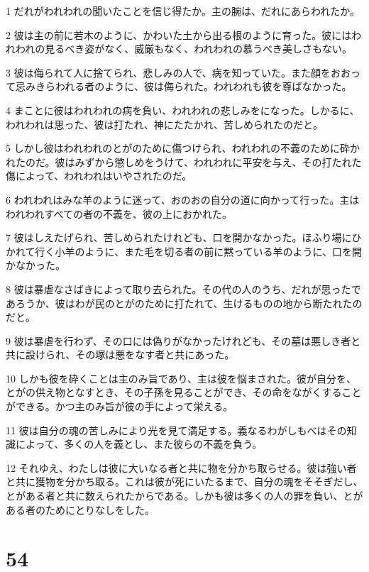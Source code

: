 \par 1 だれがわれわれの聞いたことを信じ得たか。主の腕は、だれにあらわれたか。
\par 2 彼は主の前に若木のように、かわいた土から出る根のように育った。彼にはわれわれの見るべき姿がなく、威厳もなく、われわれの慕うべき美しさもない。
\par 3 彼は侮られて人に捨てられ、悲しみの人で、病を知っていた。また顔をおおって忌みきらわれる者のように、彼は侮られた。われわれも彼を尊ばなかった。
\par 4 まことに彼はわれわれの病を負い、われわれの悲しみをになった。しかるに、われわれは思った、彼は打たれ、神にたたかれ、苦しめられたのだと。
\par 5 しかし彼はわれわれのとがのために傷つけられ、われわれの不義のために砕かれたのだ。彼はみずから懲しめをうけて、われわれに平安を与え、その打たれた傷によって、われわれはいやされたのだ。
\par 6 われわれはみな羊のように迷って、おのおの自分の道に向かって行った。主はわれわれすべての者の不義を、彼の上におかれた。
\par 7 彼はしえたげられ、苦しめられたけれども、口を開かなかった。ほふり場にひかれて行く小羊のように、また毛を切る者の前に黙っている羊のように、口を開かなかった。
\par 8 彼は暴虐なさばきによって取り去られた。その代の人のうち、だれが思ったであろうか、彼はわが民のとがのために打たれて、生けるものの地から断たれたのだと。
\par 9 彼は暴虐を行わず、その口には偽りがなかったけれども、その墓は悪しき者と共に設けられ、その塚は悪をなす者と共にあった。
\par 10 しかも彼を砕くことは主のみ旨であり、主は彼を悩まされた。彼が自分を、とがの供え物となすとき、その子孫を見ることができ、その命をながくすることができる。かつ主のみ旨が彼の手によって栄える。
\par 11 彼は自分の魂の苦しみにより光を見て満足する。義なるわがしもべはその知識によって、多くの人を義とし、また彼らの不義を負う。
\par 12 それゆえ、わたしは彼に大いなる者と共に物を分かち取らせる。彼は強い者と共に獲物を分かち取る。これは彼が死にいたるまで、自分の魂をそそぎだし、とがある者と共に数えられたからである。しかも彼は多くの人の罪を負い、とがある者のためにとりなしをした。

\chapter{54}

